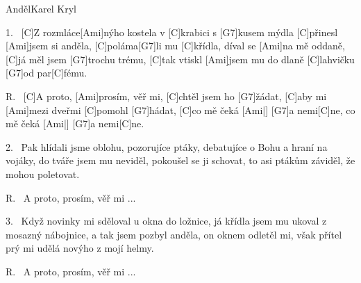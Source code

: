 \begin{song}{Anděl}{Karel Kryl}

\begin{xverse}{1.~}
[\large C]Z rozmláce[\large Ami]nýho kostela v [\large C]krabici s [\large G7]kusem mýdla
[\large C]přinesl [\large Ami]jsem si anděla, [\large C]poláma[\large G7]li mu [\large C]křídla,
díval se [\large Ami]na mě oddaně, [\large C]já měl jsem [\large G7]trochu trému,
[\large C]tak vtiskl [\large Ami]jsem mu do dlaně [\large C]lahvičku [\large G7]od par[\large C]fému.
\end{xverse}

\begin{xverse}{R.~}
[\large C]A proto, [\large Ami]prosím, věř mi, [\large C]chtěl jsem ho [\large G7]{žá}dat,
[\large C]aby mi [\large Ami]mezi dveřmi [\large C]pomohl [\large G7]hádat,
[\large C]co mě čeká [\large Ami|]{}   [\large G7]a nemi[\large C]ne, co mě čeká [\large Ami|]{}   [\large G7]a    nemi[\large C]ne.
\end{xverse}

\begin{xverse}{2.~}
Pak hlídali jsme oblohu, pozorujíce ptáky,
debatujíce o Bohu a hraní na vojáky,
do tváře jsem mu neviděl, pokoušel se ji schovat,
to asi ptákům záviděl, že mohou poletovat.
\end{xverse}

\begin{xverse}{R.~}
A proto, prosím, věř mi ...
\end{xverse}

\begin{xverse}{3.~}
Když novinky mi sděloval u okna do ložnice,
já křídla jsem mu ukoval z mosazný nábojnice,
a tak jsem pozbyl anděla, on oknem odletěl mi,
však přítel prý mi udělá novýho z mojí helmy.
\end{xverse}

\begin{xverse}{R.~}
A proto, prosím, věř mi ...
\end{xverse}

\end{song}

